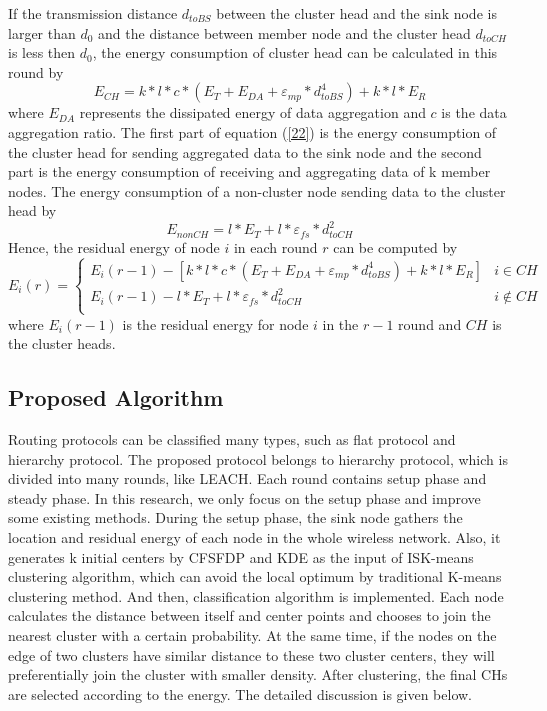 \documentclass[11pt]{report}
\begin{document}
	If the transmission distance $d_{toBS}$ between the cluster head and the sink node is larger than $d_0$ and the distance between member node and the cluster head $d_{toCH}$ is less then $d_0$, the energy consumption of cluster head can be calculated in this round by
	\begin{equation}
	\label{22}
	E_{CH} = k*l*c*\left(E_{T} + E_{DA} + \varepsilon_{mp}*d^4_{toBS}\right) + k*l*E_R
	\end{equation}
	where $E_{DA}$ represents the dissipated energy of data aggregation and $c$ is the data aggregation ratio. The first part of equation (\ref{22}) is the energy consumption of the cluster head for sending aggregated data to the sink node and the second part is the energy consumption of receiving and aggregating data of k member nodes. The energy consumption of a non-cluster node sending data to the cluster head by
	\begin{equation}
	E_{nonCH} = l * E_T + l * \varepsilon_{fs} * d^2_{toCH}
	\end{equation}
	Hence, the residual energy of node $i$ in each round $r$ can be computed by
	\begin{equation}
	\label{24}
	E_i\left(r\right)=\left\{ \begin{array}{ll}
	E_i\left(r-1\right) - [ k*l*c*\left(E_{T} + E_{DA} + \varepsilon_{mp} * d^4_{toBS}\right) + k*l*E_R]& i \in CH \\
	E_i\left(r-1\right) - l * E_T + l * \varepsilon_{fs} * d^2_{toCH} & i \notin CH \\
	\end{array} \right.
	\end{equation}
	where $E_i\left(r-1\right)$ is the residual energy for node $i$ in the $r-1$ round and $CH$ is the cluster heads.

	
	
	\subsection{Proposed Algorithm}
	 Routing protocols can be classified many types, such as flat protocol and hierarchy protocol. The proposed protocol belongs to hierarchy protocol, which is divided into many rounds, like LEACH. Each round contains setup phase and steady phase. In this research, we only focus on the setup phase and improve some existing methods. During the setup phase,  the sink node gathers the location and residual energy of each node in the whole wireless network. Also, it generates k initial centers by CFSFDP and KDE as the input of ISK-means clustering algorithm, which can avoid the local optimum by traditional K-means clustering method. And then, classification algorithm is implemented. Each node calculates the distance between itself and center points and chooses to join the nearest cluster with a certain probability. At the same time, if the nodes on the edge of two clusters have similar distance to these two cluster centers, they will preferentially join the cluster with smaller density. After clustering, the final CHs are selected according to the energy. The detailed discussion is given below.
	
\end{document}
